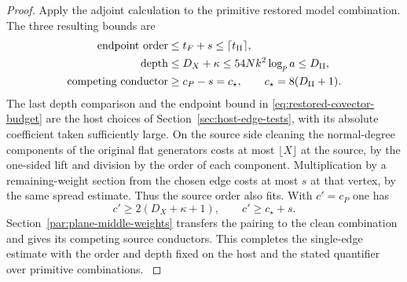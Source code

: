 \begin{proof}
Apply the adjoint calculation to the primitive restored model
combination. The three resulting bounds are
\begin{equation}\label{eq:restored-covector-budget}
 \begin{aligned}
 \text{endpoint order}&\le t_F+s\le\lceil t_{\rm II}\rceil,\\
 \text{depth}&\le D_X+\kappa\le54Nk^2\log_p a\le D_{\rm II},\\
 \text{competing conductor}&\ge c_P-s=c_\star,
                    \qquad c_\star=8(D_{\rm II}+1).
 \end{aligned}
\end{equation}
The last depth comparison and the endpoint bound in
\eqref{eq:restored-covector-budget} are the host choices of Section~\ref{sec:host-edge-tests},
with its absolute coefficient taken sufficiently large.
On the source side cleaning
the normal-degree components of the original flat generators
costs at most \(\lfloor X\rfloor\) at the source, by the
one-sided lift and division by the order of each component.
Multiplication by a remaining-weight section from the chosen
edge costs at most \(s\) at that vertex, by the same spread
estimate. Thus the source order also fits. With \(c'=c_P\)
one has \[
 c'\ge2(D_X+\kappa+1),\qquad c'\ge c_\star+s.
\]
Section~\ref{par:plane-middle-weights} transfers the pairing
to the clean combination and gives its competing source
conductors. This completes the single-edge estimate with the
order and depth fixed on the host and the stated quantifier over
primitive combinations. \label{cor:plane-edge-covector-1}
\end{proof}
